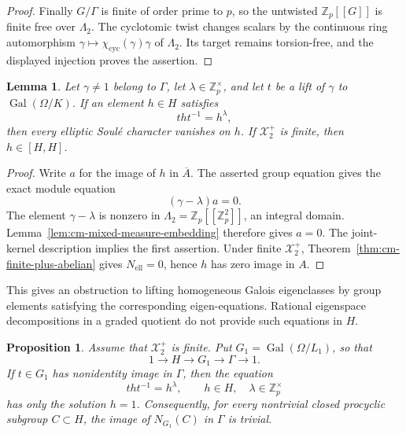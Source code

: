 \documentclass[11pt]{article}
\newtheorem{proposition}[theorem]{Proposition}
\newtheorem{lemma}[theorem]{Lemma}
\theoremstyle{definition}\newtheorem{definition}[theorem]{Definition}
\begin{document}
\begin{proof}
Finally \(G/\Gamma\) is finite of order prime to \(p\), so the
untwisted \(\mathbb Z_p[[G]]\) is finite free over \(\Lambda_2\).
The cyclotomic twist changes scalars by the continuous ring
automorphism \(\gamma\mapsto\chi_{\mathrm{cyc}}(\gamma)\gamma\)
of \(\Lambda_2\).  Its target remains torsion-free, and the
displayed injection proves the assertion.
\end{proof}

\begin{lemma}\label{lem:cm-exact-eigenlift-obstruction}
Let \(\gamma\neq1\) belong to \(\Gamma\), let
\(\lambda\in\mathbb Z_p^\times\), and let \(t\) be a lift of
\(\gamma\) to \(\operatorname{Gal}(\Omega/K)\).
If an element \(h\in H\) satisfies
\[
                         tht^{-1}=h^\lambda ,
\]
then every elliptic Soul\'e character vanishes on \(h\).
If \(\mathcal X_2^+\) is finite, then \(h\in[H,H]\).
\end{lemma}

\begin{proof}
Write \(a\) for the image of \(h\) in \(\overline A\).
The asserted group equation gives the exact module equation
\[
                              (\gamma-\lambda)a=0.
\]
The element \(\gamma-\lambda\) is nonzero in
\(\Lambda_2=\mathbb Z_p[[\mathbb Z_p^2]]\), an integral domain.
Lemma~\ref{lem:cm-mixed-measure-embedding} therefore gives \(a=0\).
The joint-kernel description implies the first assertion.
Under finite \(\mathcal X_2^+\),
Theorem~\ref{thm:cm-finite-plus-abelian} gives
\(N_{\mathrm{ell}}=0\), hence \(h\) has zero image in \(A\).
\end{proof}

This gives an obstruction to lifting homogeneous
Galois eigenclasses by group elements satisfying the corresponding
eigen-equations.  Rational eigenspace decompositions in a graded
quotient do not provide such equations in \(H\).

\begin{proposition}\label{prop:cm-no-normalized-cyclic}
Assume that \(\mathcal X_2^+\) is finite.  Put
\(G_1=\operatorname{Gal}(\Omega/L_1)\), so that
\[
             1\longrightarrow H\longrightarrow G_1
               \longrightarrow\Gamma\longrightarrow1 .
\]
If \(t\in G_1\) has nonidentity image in \(\Gamma\), then the
equation
\[
                 tht^{-1}=h^\lambda,\qquad
                    h\in H,\quad\lambda\in\mathbb Z_p^\times
\]
has only the solution \(h=1\).
Consequently, for every nontrivial closed procyclic subgroup
\(C\subset H\), the image of \(N_{G_1}(C)\) in \(\Gamma\) is
trivial.
\end{proposition}
\end{document}
